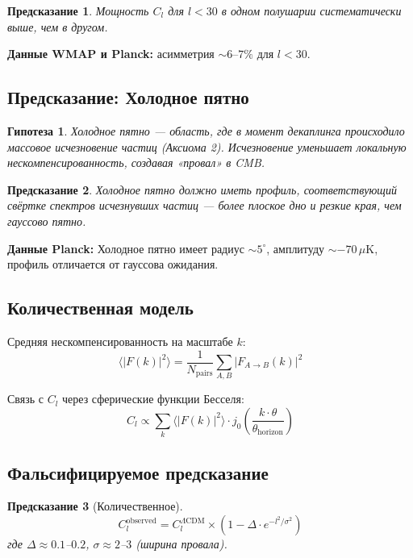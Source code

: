 \documentclass[11pt,a4paper]{article}
\newtheorem{hypothesis}{Гипотеза}[section]
\newtheorem{prediction}{Предсказание}[section]
\theoremstyle{definition}
\begin{document}
\begin{prediction}
Мощность $C_l$ для $l < 30$ в одном полушарии систематически выше, чем в другом.
\end{prediction}

\textbf{Данные WMAP и Planck:} асимметрия $\sim 6$--$7\%$ для $l < 30$.

\subsection{Предсказание: Холодное пятно}

\begin{hypothesis}
Холодное пятно --- область, где в момент декаплинга происходило массовое исчезновение частиц (Аксиома 2). Исчезновение уменьшает локальную нескомпенсированность, создавая «провал» в CMB.
\end{hypothesis}

\begin{prediction}
Холодное пятно должно иметь профиль, соответствующий свёртке спектров исчезнувших частиц --- более плоское дно и резкие края, чем гауссово пятно.
\end{prediction}

\textbf{Данные Planck:} Холодное пятно имеет радиус $\sim 5^\circ$, амплитуду $\sim -70\,\mu\text{K}$, профиль отличается от гауссова ожидания.

\subsection{Количественная модель}

Средняя нескомпенсированность на масштабе $k$:
\begin{equation}
    \langle |F(k)|^2 \rangle = \frac{1}{N_{\text{pairs}}} \sum_{A,B} |F_{A \to B}(k)|^2
\end{equation}

Связь с $C_l$ через сферические функции Бесселя:
\begin{equation}
    C_l \propto \sum_k \langle |F(k)|^2 \rangle \cdot j_0\left( \frac{k \cdot \theta}{\theta_{\text{horizon}}} \right)
\end{equation}

\subsection{Фальсифицируемое предсказание}

\begin{prediction}[Количественное]
\begin{equation}
    C_l^{\text{observed}} = C_l^{\Lambda\text{CDM}} \times \left( 1 - \Delta \cdot e^{-l^2 / \sigma^2} \right)
\end{equation}
где $\Delta \approx 0.1$--$0.2$, $\sigma \approx 2$--$3$ (ширина провала).
\end{prediction}
\end{document}
